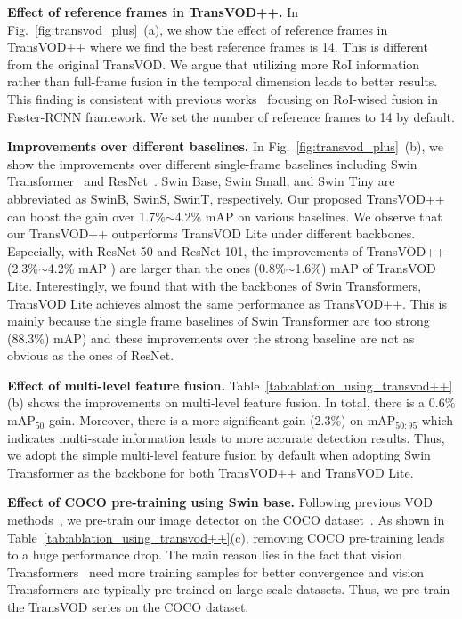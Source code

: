 \documentclass[10pt,journal,compsoc]{IEEEtran}
\begin{document}
\noindent
\textbf{Effect of reference frames in TransVOD++.} In Fig.~\ref{fig:transvod_plus}~(a), we show the effect of reference frames in TransVOD++ where we find the best reference frames is 14. This is different from the original TransVOD. We argue that utilizing more RoI information rather than full-frame fusion in the temporal dimension leads to better results. This finding is consistent with previous works~\cite{deng19rdn,han2021cfanet,chen2020memory} focusing on RoI-wised fusion in Faster-RCNN framework. We set the number of reference frames to 14 by default.


\noindent
\textbf{Improvements over different baselines.}
In Fig.~\ref{fig:transvod_plus}~(b), we show the improvements over different single-frame baselines including Swin Transformer~\cite{liu2021swin} and ResNet~\cite{he16res}. Swin Base, Swin Small, and Swin Tiny are abbreviated as SwinB, SwinS, SwinT, respectively.
Our proposed TransVOD++ can boost the gain over 1.7\%$\sim$4.2\% mAP on various baselines. We observe that our TransVOD++ outperforms TransVOD Lite under different backbones. Especially, with ResNet-50 and ResNet-101, the improvements of TransVOD++ (2.3\%$\sim$4.2\% mAP ) are larger than the ones (0.8\%$\sim$1.6\%) mAP  of TransVOD Lite. Interestingly, we found that with the backbones of Swin Transformers, TransVOD Lite achieves almost the same performance as TransVOD++. This is mainly because the single frame baselines of Swin Transformer are too strong (88.3\%) mAP) and these improvements over the strong baseline are not as obvious as the ones of ResNet.


\noindent
\textbf{Effect of multi-level feature fusion.} Table~\ref{tab:ablation_using_transvod++}(b) shows the improvements on multi-level feature fusion. In total, there is a 0.6$\%$ mAP$_{50}$ gain. Moreover, there is a more significant gain (2.3\%) on mAP$_{50:95}$ which indicates multi-scale information leads to more accurate detection results. Thus, we adopt the simple multi-level feature fusion by default when adopting Swin Transformer as the backbone for both TransVOD++ and TransVOD Lite.

\noindent
\textbf{Effect of COCO pre-training using Swin base.} Following previous VOD methods~\cite{yao2020video,liu2019looking,qian2020adaptive}, we pre-train our image detector on the COCO dataset~\cite{COCO_dataset}. As shown in Table~\ref{tab:ablation_using_transvod++}(c), removing COCO pre-training leads to a huge performance drop. The main reason lies in the fact that vision Transformers~\cite{dosovitskiy2020image} need more training samples for better convergence and vision Transformers are typically pre-trained on large-scale datasets. 
Thus, we pre-train the TransVOD series on the COCO dataset. 
\end{document}
